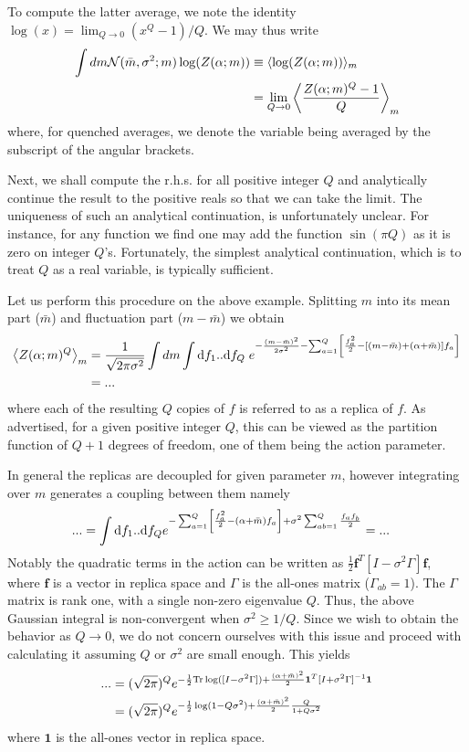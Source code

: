 To compute the latter average, we note the identity  $\log(x)=\lim_{Q \rightarrow 0}(x^Q-1)/Q$. We may thus write 
\begin{align}
\int dm {\cal N}(\bar{m},\sigma^2;m)\log(Z(\alpha;m)) &\equiv \langle\log(Z(\alpha;m))\rangle_{m} \\ \nonumber 
&= \lim_{Q \rightarrow 0} \left \langle \frac{Z(\alpha;m)^Q - 1}{Q}
\right \rangle_{m} \end{align}
where, for quenched averages, we denote the variable being averaged by the subscript of the angular brackets. 

Next, we shall compute the r.h.s. for all positive integer $Q$ and analytically continue the result to the positive reals so that we can take the limit. The uniqueness of such an analytical continuation, is unfortunately unclear. For instance, for any function we find one may add the function $\sin(\pi Q)$ as it is zero on integer $Q$'s. Fortunately, the simplest analytical continuation, which is to treat $Q$ as a real variable, is typically sufficient. 

Let us perform this procedure on the above example. Splitting $m$ into its mean part ($\bar{m}$) and fluctuation part ($m-\bar{m}$) we obtain  
\begin{align}
\notag \left\langle Z(\alpha;m)^Q 
\right\rangle_{m} &= \frac{1}{\sqrt{2\pi \sigma^2}}\int dm \int \text{d} f_1..\text{d} f_Q \; e^{-\frac{(m-\bar{m})^2}{2\sigma^2}-\sum_{a=1}^Q \left[\frac{f_a^2}{2}-[(m-\bar{m})+(\alpha+\bar{m})] f_a\right]}\\  &= ...
\end{align}
where each of the resulting $Q$ copies of $f$ is referred to as a replica of $f$. As advertised, for a given positive integer $Q$, this can be viewed as the partition function of $Q+1$ degrees of freedom, one of them being the action parameter. 

In general the replicas are decoupled for given parameter $m$, however integrating over $m$ generates a coupling between them namely
\begin{align}
... &= \int \text{d} f_1..\text{d} f_Q e^{-\sum_{a=1}^Q \left[\frac{f_a^2}{2}-(\alpha+\bar{m}) f_a\right]+\sigma^2 \sum_{ab=1}^Q \frac{f_a f_b}{2}} = ...
\end{align}
Notably the quadratic terms in the action can be written as $\frac{1}{2}\bm{f}^T [I-\sigma^2\Gamma] \bm{f}$, where $\bm{f}$ is a vector in replica space and $\Gamma$ is the all-ones matrix ($\Gamma_{ab}=1$). The $\Gamma$ matrix is rank one, with a single non-zero eigenvalue $Q$. Thus, the above Gaussian integral is non-convergent when $\sigma^2 \geq 1/Q$. Since we wish to obtain the behavior as $Q \rightarrow 0$, we do not concern ourselves with this issue and proceed with calculating it assuming $Q$ or $\sigma^2$ are small enough. This yields 
\begin{align}
... &= (\sqrt{2\pi})^Q e^{-\frac{1}{2}\text{Tr}\log([I-\sigma^2 \Gamma])+\frac{(\alpha+\bar{m})^2}{2} \bm{1}^T [I + \sigma^2\Gamma]^{-1} \bm{1}} \\ \nonumber 
&= (\sqrt{2\pi})^Q e^{-\frac{1}{2}\log(1-Q\sigma^2)+\frac{(\alpha+\bar{m})^2}{2} \frac{Q}{1+Q\sigma^2}}\end{align}
where $\bm{1}$ is the all-ones vector in replica space. 

